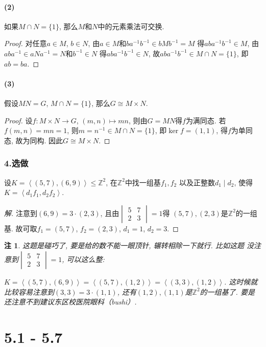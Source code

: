 \documentclass[12pt, a4paper, fontset=windows]{ctexart}
\newcommand{\Z}{\mathbb{Z}}
\newcommand{\gen}[1]{\left\langle{#1}\right\rangle}
\newcommand{\isom}{\cong} %
\newcommand{\kh}[1]{（{#1}）} %
\newcommand{\xuan}{{\normalsize 选做}}
\def\vmat#1{\begin{vmatrix}#1\end{vmatrix}}
\newtheorem*{remark}{注}
\newenvironment{solution}{\begin{proof}[解]}{\end{proof}}
\begin{document}
\subsection*{(2)}

如果$M\cap N=\{1\}$, 那么$M$和$N$中的元素乘法可交换. 

\begin{proof}
对任意$a\in M$, $b\in N$, 由$a\in M$和$ba^{-1}b^{-1}\in bMb^{-1}=M$
得$aba^{-1}b^{-1}\in M$, 由$aba^{-1}\in aNa^{-1}=N$和$b^{-1}\in N$
得$aba^{-1}b^{-1}\in N$, 故$aba^{-1}b^{-1}\in M\cap N=\{1\}$, 即$ab=ba$. 
\end{proof}

\subsection*{(3)}

假设$MN=G$, $M\cap N=\{1\}$, 那么$G\isom M\times N$. 

\begin{proof}
设$f:M\times N\to G$, $(m,n)\mapsto mn$, 则由$G=MN$得$f$为满同态. 
若$f(m,n)=mn=1$, 则$m=n^{-1}\in M\cap N=\{1\}$, 即$\ker f=(1,1)$, 
得$f$为单同态, 故为同构. 因此$G\isom M\times N$. 
\end{proof}

\section*{4.\xuan}
\label{5769}

设$K=\gen{(5,7),(6,9)}\le\Z^2$, 在$\Z^2$中找一组基$f_1,f_2$
以及正整数$d_1\mid d_2$, 使得$K=\gen{d_1f_1,d_2f_2}$. 

\begin{solution}
注意到$(6,9)=3\cdot(2,3)$, 且由$\vmat{5&7\\2&3}=1$得
$(5,7),(2,3)$是$\Z^2$的一组基. 故可取$f_1=(5,7)$, 
$f_2=(2,3)$, $d_1=1$, $d_2=3$. 
\end{solution}

\begin{remark}
这题是碰巧了, 要是给的数不能一眼顶针, 辗转相除一下就行. 比如这题
没注意到$\vmat{5&7\\2&3}=1$, 可以这么整: 

$K=\gen{(5,7),(6,9)}=\gen{(5,7),(1,2)}=\gen{(3,3),(1,2)}$. 
这时候就比较容易注意到$(3,3)=3\cdot(1,1)$, 
还有$(1,2),(1,1)$是$\Z^2$的一组基了. 
要是还注意不到建议东区校医院眼科\kh{\sf bushi}. 
\end{remark}

\clearpage
\part{5.1 - 5.7}
\end{document}
